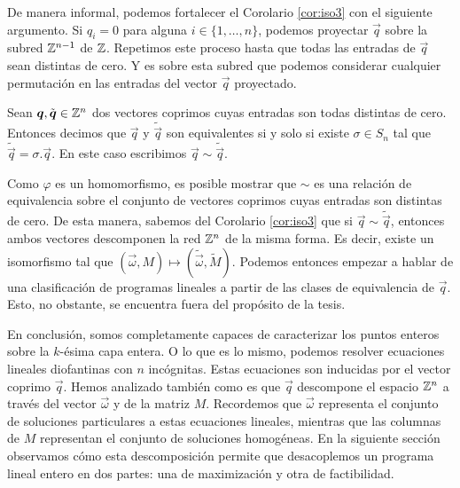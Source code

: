 De manera informal, podemos fortalecer el Corolario \ref{cor:iso3} con el siguiente argumento. Si
$q_i = 0$ para alguna $i \in \lbrace 1, \ldots, n \rbrace$, podemos proyectar $\vec{q}$ sobre
la subred $\mathbb{Z}^{n-1}$ de $\mathbb{Z}$. Repetimos este proceso hasta que todas las entradas de $\vec{q}$ sean
distintas de cero. Y es sobre esta subred que podemos considerar cualquier permutación en las
entradas del vector $\vec{q}$ proyectado.
\begin{definition}
	Sean $\boldsymbol{q}, \tilde{\boldsymbol{q}} \in \mathbb{Z}^n$ dos vectores coprimos cuyas entradas son todas
	distintas de cero. Entonces decimos que $\vec{q}$ y $\tilde{\vec{q}}$ son equivalentes si y solo
	si existe $\sigma \in S_n$ tal que $\tilde{\vec{q}} = \sigma.\vec{q}$. En este caso escribimos
	$\vec{q} \sim \tilde{\vec{q}}$.
\end{definition}
Como $\varphi$ es un homomorfismo, es posible mostrar que $\sim$ es una relación de equivalencia
sobre el conjunto de vectores coprimos cuyas entradas son distintas de cero. De esta manera, sabemos
del Corolario \ref{cor:iso3} que si $\vec{q} \sim \tilde{\vec{q}}$, entonces ambos vectores
descomponen la red $\mathbb{Z}^n$ de la misma forma. Es decir, existe un isomorfismo tal que $(\vec{\omega},
M) \mapsto (\tilde{\vec{\omega}}, \tilde{M})$. Podemos entonces empezar a hablar de una
clasificación de programas lineales a partir de las clases de equivalencia de $\vec{q}$. Esto, no
obstante, se encuentra fuera del propósito de la tesis.

En conclusión, somos completamente capaces de caracterizar los puntos enteros sobre la $k$-ésima
capa entera. O lo que es lo mismo, podemos resolver ecuaciones lineales diofantinas con $n$
incógnitas. Estas ecuaciones son inducidas por el vector coprimo $\vec{q}$. Hemos analizado también
como es que $\vec{q}$ descompone el espacio $\mathbb{Z}^n$ a través del vector $\vec{\omega}$ y de la matriz
$M$. Recordemos que $\vec{\omega}$ representa el conjunto de soluciones particulares a estas ecuaciones
lineales, mientras que las columnas de $M$ representan el conjunto de soluciones homogéneas. En la
siguiente sección observamos cómo esta descomposición permite que desacoplemos un programa lineal
entero en dos partes: una de maximización y otra de factibilidad.


